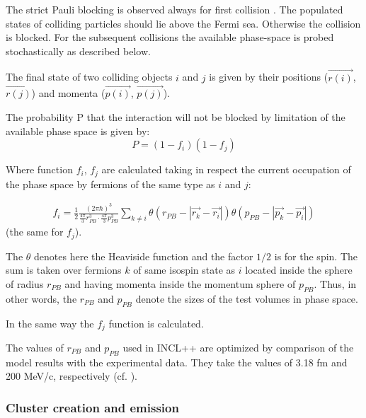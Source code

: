 
The strict Pauli blocking is observed always for first collision \cite{INCLboudard2013new}. 
The populated states of colliding particles should 
lie above the Fermi sea. Otherwise the collision is blocked.
For the subsequent collisions the available phase-space is probed stochastically as described below.

The final state of two colliding objects $i$ and $j$ is given by their positions ($\vec{r(i)}$, $\vec{r(j)}$) 
and momenta ($\vec{p(i)}$, $\vec{p(j)}$).

The probability P that the interaction will not be blocked by limitation of the available phase space is given by:
\begin{equation}
	P=(1-f_i)(1-f_j)
\end{equation}

Where function $f_i$, $f_j$ are calculated taking in respect the current occupation 
of the phase space by fermions of the same type as $i$ and $j$: 

\begin{align}
	f_i=\frac{1}{2}\frac{\left(2\pi\hbar\right)^3}{\frac{4\pi}{3}r_{PB}^3\cdot\frac{4\pi}{3}p_{PB}^3}\sum_{k\ne i}\theta\!\left(r_{PB}-\left|\vec{r_k}-\vec{r_i}\right|\right)\theta\!\left(p_{PB}-\left|\vec{p_k}-\vec{p_i}\right|\right)
\end{align}
(the same for $f_j$).

The $\theta$ denotes here the Heaviside function and the factor $1/2$ is for the spin. The sum is taken over fermions $k$ of same isospin state as $i$ located inside the sphere of radius $r_{PB}$ 
and having momenta inside the momentum sphere of $p_{PB}$.
Thus, in other words, the $r_{PB}$ and $p_{PB}$ denote the sizes of the test volumes in phase space.
 

In the same way the $f_j$ function is calculated.

The values of $r_{PB}$ and $p_{PB}$ used in INCL++ are optimized by comparison of the model results with the experimental data.
They take the values of 3.18 fm and 200 MeV/c, respectively (cf. \cite{INCL_CUGN_1997}).


\subsubsection{Cluster creation and emission}\label{coalesence}

